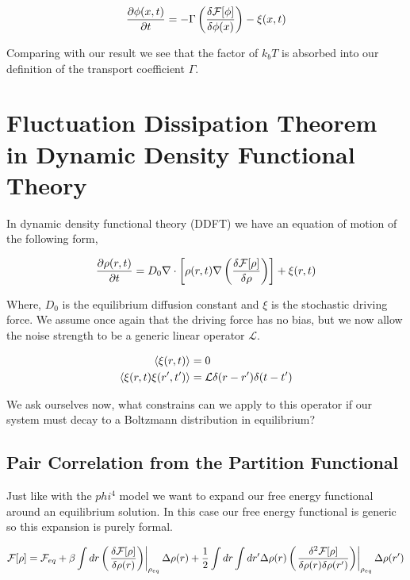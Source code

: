 \begin{equation}\label{eom}
	\frac{\partial \phi(x,t)}{\partial t} = -\Gamma \left(\frac{\delta \mathcal{F}[\phi]}{\delta \phi(x)}\right) - \xi(x,t)
\end{equation}

Comparing with our result we see that the factor of $k_bT$ is absorbed into our definition of the transport coefficient $\Gamma$.

\section{Fluctuation Dissipation Theorem in Dynamic Density Functional Theory}

In dynamic density functional theory (DDFT) we have an equation of motion of the following form,

\begin{equation}
	\frac{\partial \rho(r, t)}{\partial t} = D_0 \nabla \cdot \left[\rho(r,t)\nabla \left(\frac{\delta \mathcal{F}[\rho]}{\delta \rho}\right)\right] + \xi(r, t)
\end{equation}

Where, $D_0$ is the equilibrium diffusion constant and $\xi$ is the stochastic driving force. We assume once again that the driving force has no bias, but we now allow the noise strength to be a generic linear operator $\mathcal{L}$.

\begin{align}
	\langle \xi(r,t) \rangle &= 0 \\
	\left\langle \xi(r, t) \xi(r^\prime, t^\prime) \right\rangle &= \mathcal{L} \delta (r-r^\prime) \delta (t -t^\prime)
\end{align}

We ask ourselves now, what constrains can we apply to this operator if our system must decay to a Boltzmann distribution in equilibrium?

\subsection{Pair Correlation from the Partition Functional}

Just like with the $phi^4$ model we want to expand our free energy functional around an equilibrium solution. In this case our free energy functional is generic so this expansion is purely formal.

\begin{equation}
	\mathcal{F}[\rho] = \mathcal{F}_{eq} + \beta\int dr \left(\left.\frac{\delta \mathcal{F}[\rho]}{\delta \rho(r)}\right)\right\vert_{\rho_{eq}}\Delta\rho(r) + \frac{1}{2} \int dr \int dr^\prime \Delta\rho(r) \left(\left.\frac{\delta^2 \mathcal{F}[\rho]}{\delta \rho(r) \delta \rho(r^\prime)}\right)\right\vert_{\rho_{eq}} \Delta\rho(r^\prime)
\end{equation}

